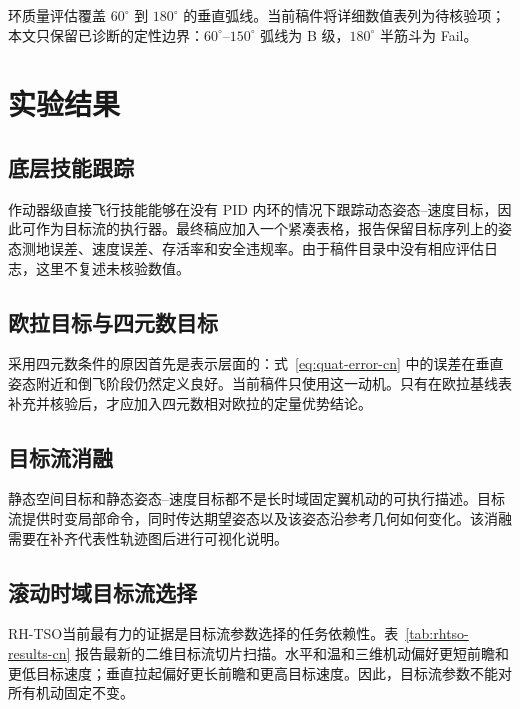 \documentclass{article}
\newcommand{\rhtso}{RH-TSO}
\begin{document}
环质量评估覆盖 $60^\circ$ 到 $180^\circ$ 的垂直弧线。当前稿件将详细数值表列为待核验项；本文只保留已诊断的定性边界：$60^\circ$--$150^\circ$ 弧线为 B 级，$180^\circ$ 半筋斗为 Fail。


\section{实验结果}

\subsection{底层技能跟踪}

作动器级直接飞行技能能够在没有 PID 内环的情况下跟踪动态姿态--速度目标，因此可作为目标流的执行器。最终稿应加入一个紧凑表格，报告保留目标序列上的姿态测地误差、速度误差、存活率和安全违规率。由于稿件目录中没有相应评估日志，这里不复述未核验数值。

\subsection{欧拉目标与四元数目标}

采用四元数条件的原因首先是表示层面的：式~\eqref{eq:quat-error-cn} 中的误差在垂直姿态附近和倒飞阶段仍然定义良好。当前稿件只使用这一动机。只有在欧拉基线表补充并核验后，才应加入四元数相对欧拉的定量优势结论。

\subsection{目标流消融}

静态空间目标和静态姿态--速度目标都不是长时域固定翼机动的可执行描述。目标流提供时变局部命令，同时传达期望姿态以及该姿态沿参考几何如何变化。该消融需要在补齐代表性轨迹图后进行可视化说明。

\subsection{滚动时域目标流选择}

\rhtso 当前最有力的证据是目标流参数选择的任务依赖性。表~\ref{tab:rhtso-results-cn} 报告最新的二维目标流切片扫描。水平和温和三维机动偏好更短前瞻和更低目标速度；垂直拉起偏好更长前瞻和更高目标速度。因此，目标流参数不能对所有机动固定不变。
\end{document}
